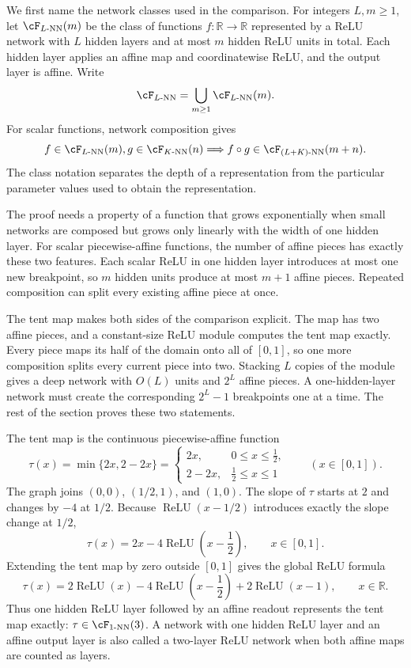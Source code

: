 \documentclass[11pt,twoside]{article}
\newcommand{\R}{\mathbb R}
\newcommand{\relu}{\operatorname{ReLU}}
\theoremstyle{definition}
\theoremstyle{remark}
\begin{document}
We first name the network classes used in the comparison. For integers
$L,m\geq1$, let $\cF_{L\text{-NN}}(m)$ be the class of functions
$f:\R\to\R$ represented by a ReLU network with $L$ hidden layers and at most
$m$ hidden ReLU units in total. Each hidden layer applies an affine map and
coordinatewise ReLU, and the output layer is affine. Write
\[
 \cF_{L\text{-NN}}=\bigcup_{m\geq1}\cF_{L\text{-NN}}(m).
\]
For scalar functions, network composition gives
\begin{equation}
 f\in\cF_{L\text{-NN}}(m),\quad
 g\in\cF_{K\text{-NN}}(n)
 \quad\Longrightarrow\quad
 f\circ g\in\cF_{(L+K)\text{-NN}}(m+n).
 \label{eq:nn-class-composition}
\end{equation}
The class notation separates the depth of a representation from the
particular parameter values used to obtain the representation.

The proof needs a property of a function that grows exponentially when small
networks are composed but grows only linearly with the width of one hidden
layer. For scalar piecewise-affine functions, the number of affine pieces has
exactly these two features. Each scalar ReLU in one hidden layer introduces
at most one new breakpoint, so $m$ hidden units produce at most $m+1$ affine
pieces. Repeated composition can split every existing affine piece at once.

The tent map makes both sides of the comparison explicit. The map has two
affine pieces, and a constant-size ReLU module computes the tent map exactly.
Every
piece maps its half of the domain onto all of $[0,1]$, so one more composition
splits every current piece into two. Stacking $L$ copies of the module gives a
deep network with $O(L)$ units and $2^L$ affine pieces. A one-hidden-layer
network must create the corresponding $2^L-1$ breakpoints one at a time. The
rest of the section proves these two statements.

The tent map is the continuous piecewise-affine function
\begin{equation}
 \tau(x)=\min\{2x,2-2x\}
 =\begin{cases}
   2x,&0\leq x\leq\tfrac12,\\
   2-2x,&\tfrac12\leq x\leq1
  \end{cases}
 \qquad (x\in[0,1]).
 \label{eq:tent-definition}
\end{equation}
The graph joins $(0,0)$, $(1/2,1)$, and $(1,0)$. The slope of $\tau$ starts at
$2$ and changes by $-4$ at $1/2$. Because $\relu(x-1/2)$ introduces exactly
the slope change at $1/2$,
\[
 \tau(x)=2x-4\relu\left(x-\frac12\right),
 \qquad x\in[0,1].
\]
Extending the tent map by zero outside $[0,1]$ gives the global ReLU formula
\begin{equation}
 \tau(x)=2\relu(x)-4\relu\left(x-\frac12\right)
          +2\relu(x-1),
 \qquad x\in\R.
 \label{eq:tent}
\end{equation}
Thus one hidden ReLU layer followed by an affine readout represents the tent
map exactly: $\tau\in\cF_{1\text{-NN}}(3)$. A network with one hidden ReLU
layer and an affine output layer is also called a two-layer ReLU network when
both affine maps are counted as layers.
\end{document}
